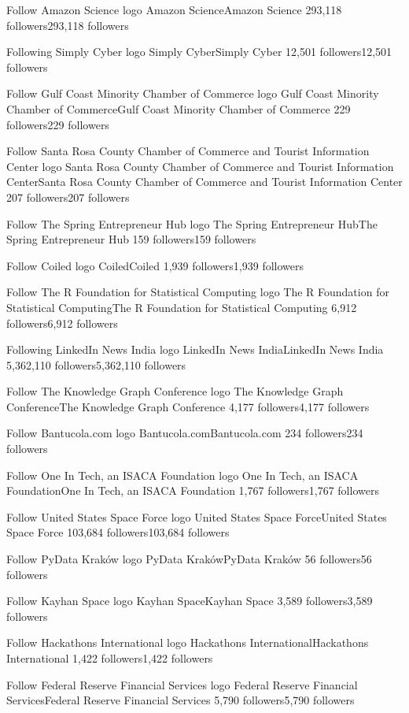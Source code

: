 Follow
Amazon Science logo
Amazon ScienceAmazon Science
293,118 followers293,118 followers

Following
Simply Cyber logo
Simply CyberSimply Cyber
12,501 followers12,501 followers

Follow
Gulf Coast Minority Chamber of Commerce logo
Gulf Coast Minority Chamber of CommerceGulf Coast Minority Chamber of Commerce
229 followers229 followers

Follow
Santa Rosa County Chamber of Commerce and Tourist Information Center logo
Santa Rosa County Chamber of Commerce and Tourist Information CenterSanta Rosa County Chamber of Commerce and Tourist Information Center
207 followers207 followers

Follow
The Spring Entrepreneur Hub logo
The Spring Entrepreneur HubThe Spring Entrepreneur Hub
159 followers159 followers

Follow
Coiled logo
CoiledCoiled
1,939 followers1,939 followers

Follow
The R Foundation for Statistical Computing logo
The R Foundation for Statistical ComputingThe R Foundation for Statistical Computing
6,912 followers6,912 followers

Following
LinkedIn News India logo
LinkedIn News IndiaLinkedIn News India
5,362,110 followers5,362,110 followers

Follow
The Knowledge Graph Conference logo
The Knowledge Graph ConferenceThe Knowledge Graph Conference
4,177 followers4,177 followers

Follow
Bantucola.com logo
Bantucola.comBantucola.com
234 followers234 followers

Follow
One In Tech, an ISACA Foundation logo
One In Tech, an ISACA FoundationOne In Tech, an ISACA Foundation
1,767 followers1,767 followers

Follow
United States Space Force logo
United States Space ForceUnited States Space Force
103,684 followers103,684 followers

Follow
PyData Kraków logo
PyData KrakówPyData Kraków
56 followers56 followers

Follow
Kayhan Space logo
Kayhan SpaceKayhan Space
3,589 followers3,589 followers

Follow
Hackathons International logo
Hackathons InternationalHackathons International
1,422 followers1,422 followers

Follow
Federal Reserve Financial Services logo
Federal Reserve Financial ServicesFederal Reserve Financial Services
5,790 followers5,790 followers

